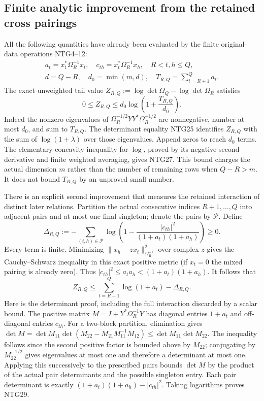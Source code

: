 \documentclass[11pt,a4paper]{article}
\begin{document}
\subsection{Finite analytic improvement from the retained cross pairings}
All the following quantities have already been evaluated by
the finite original-data operations NTG4--12:
\[
\begin{gathered}
 a_t=x_t^*\Omega_R^{-1}x_t,\quad
 c_{th}=x_t^*\Omega_R^{-1}x_h,\quad R<t,h\le Q,\\
 d=Q-R,\quad d_0=\min(m,d),\quad
 T_{R,Q}=\sum_{t=R+1}^Qa_t .
\end{gathered}                                                    \tag{NTG26}
\]
The exact unweighted tail value $Z_{R,Q}:=
\log\det\Omega_Q-\log\det\Omega_R$ satisfies
\[
 0\le Z_{R,Q}\le
 d_0\log\left(1+\frac{T_{R,Q}}{d_0}\right).
                                                               \tag{NTG27}
\]
Indeed the nonzero eigenvalues of
$\Omega_R^{-1/2}YY^*\Omega_R^{-1/2}$ are nonnegative,
number at most $d_0$, and sum to $T_{R,Q}$.
The determinant equality NTG25 identifies $Z_{R,Q}$
with the sum of $\log(1+\lambda)$ over those eigenvalues.
Append zeros to reach $d_0$ terms. The elementary
concavity inequality for $\log$, proved by its negative
second derivative and finite weighted averaging, gives
NTG27. This bound charges the actual dimension $m$ rather
than the number of remaining rows when $Q-R>m$.
It does not bound $T_{R,Q}$ by an unproved small number.

There is an explicit second improvement that measures
the retained interaction of distinct later relations.
Partition the actual consecutive indices $R+1,\ldots,Q$
into adjacent pairs and at most one final singleton;
denote the pairs by $\mathscr P$. Define
\[
 \Delta_{R,Q}:=
 -\sum_{(t,h)\in\mathscr P}
       \log\left(1-
         \frac{|c_{th}|^2}{(1+a_t)(1+a_h)}\right)\ge0 .
                                                               \tag{NTG28}
\]
Every term is finite. Minimizing
$\|x_h-zx_t\|_{\Omega_R^{-1}}^2$ over complex $z$ gives
the Cauchy--Schwarz inequality in this exact positive metric
(if $x_t=0$ the mixed pairing is already zero). Thus
$|c_{th}|^2\le a_ta_h<(1+a_t)(1+a_h)$.
It follows that
\[
 Z_{R,Q}\le
       \sum_{t=R+1}^{Q}\log(1+a_t)-\Delta_{R,Q}.
                                                               \tag{NTG29}
\]
Here is the determinant proof, including the full interaction
discarded by a scalar bound. The positive matrix
$M=I+Y^*\Omega_R^{-1}Y$ has diagonal entries $1+a_t$
and off-diagonal entries $c_{th}$. For a two-block
partition, elimination gives
$\det M=\det M_{11}\det(M_{22}-M_{21}M_{11}^{-1}M_{12})
\le\det M_{11}\det M_{22}$.
The inequality follows since the second positive factor
is bounded above by $M_{22}$; conjugating by
$M_{22}^{-1/2}$ gives eigenvalues at most one and
therefore a determinant at most one. Applying this
successively to the prescribed pairs bounds $\det M$
by the product of the actual pair determinants and
the possible singleton entry. Each pair determinant
is exactly $(1+a_t)(1+a_h)-|c_{th}|^2$.
Taking logarithms proves NTG29.
\end{document}
